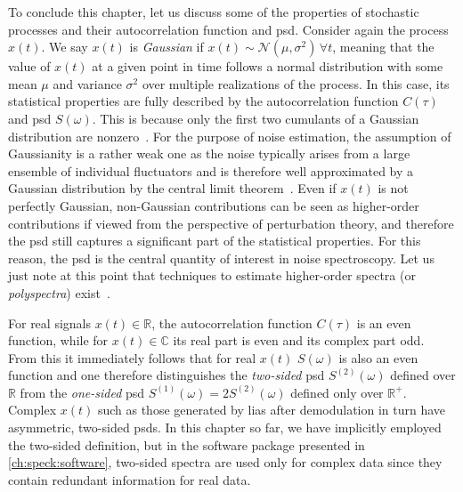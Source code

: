 To conclude this chapter, let us discuss some of the properties of stochastic processes and their autocorrelation function and \gls{psd}.
Consider again the process $x(t)$.
We say $x(t)$ is \emph{Gaussian} if $x(t)\sim\mathcal{N}(\mu, \sigma^2)\,\forall t$, meaning that the value of $x(t)$ at a given point in time follows a normal distribution with some mean $\mu$ and variance $\sigma^2$ over multiple realizations of the process.
In this case, its statistical properties are fully described by the autocorrelation function $C(\tau)$ and \gls{psd} $S(\omega)$.
This is because only the first two cumulants of a Gaussian distribution are nonzero~\cite{Fox1978}.
For the purpose of noise estimation, the assumption of Gaussianity is a rather weak one as the noise typically arises from a large ensemble of individual fluctuators and is therefore well approximated by a Gaussian distribution by the central limit theorem~\cite{Krzywda2020}.
Even if $x(t)$ is not perfectly Gaussian, non-Gaussian contributions can be seen as higher-order contributions if viewed from the perspective of perturbation theory, and therefore the \gls{psd} still captures a significant part of the statistical properties.
For this reason, the \gls{psd} is the central quantity of interest in noise spectroscopy.
Let us just note at this point that techniques to estimate higher-order spectra (or \emph{polyspectra}) exist~\cite{Nikias1993,Chandran1994,Norris2016,Szankowski2017}.

For real signals $x(t)\in\mathbb{R}$, the autocorrelation function $C(\tau)$ is an even function, while for $x(t)\in\mathbb{C}$ its real part is even and its complex part odd.
From this it immediately follows that for real $x(t)$ $S(\omega)$ is also an even function and one therefore distinguishes the \emph{two-sided} \gls{psd} $S^{(2)}(\omega)$ defined over $\mathbb{R}$ from the \emph{one-sided} \gls{psd} $S^{(1)}(\omega) = 2 S^{(2)}(\omega)$ defined only over $\mathbb{R}^+$.
Complex $x(t)$ such as those generated by \glspl{lia} after demodulation in turn have asymmetric, two-sided \glspl{psd}.
In this chapter so far, we have implicitly employed the two-sided definition, but in the software package presented in \cref{ch:speck:software}, two-sided spectra are used only for complex data since they contain redundant information for real data.
